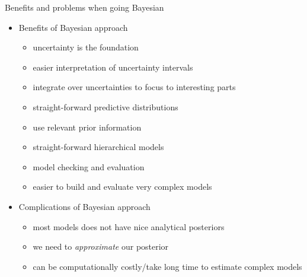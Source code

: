 \documentclass[10pt]{beamer}
\begin{document}


\begin{frame}{Benefits and problems when going Bayesian}

  \begin{itemize}
  \item Benefits of Bayesian approach
    \begin{itemize}
    \item uncertainty is the foundation
    \item easier interpretation of uncertainty intervals
    \item integrate over uncertainties to focus to interesting parts
    \item straight-forward predictive distributions
    \item use relevant prior information
    \item straight-forward hierarchical models
    \item model checking and evaluation
    \item easier to build and evaluate very complex models
    \end{itemize}
    \pause
  \item Complications of Bayesian approach
    \begin{itemize}
    \item most models does not have nice analytical posteriors
    \item we need to \emph{approximate} our posterior
    \item can be computationally costly/take long time to estimate complex models
    \end{itemize}
  \end{itemize}
\end{frame}
\end{document}
